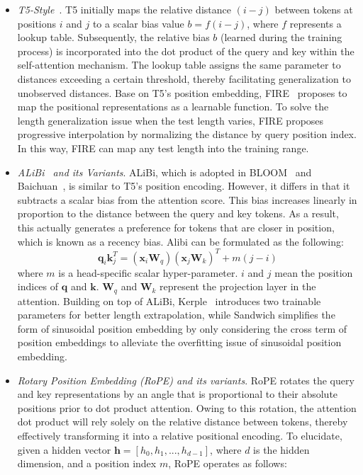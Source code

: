 \documentclass[11pt, a4paper, logo, copyright, nonumbering]{map}
\begin{document}
\begin{itemize}
\item \textit{T5-Style~\cite{raffel2020exploring}}. T5 initially maps the relative distance $(i - j)$ between tokens at positions $i$ and $j$ to a scalar bias value $b = f(i - j)$, where $f$ represents a lookup table. Subsequently, the relative bias $b$ (learned during the training process) is incorporated into the dot product of the query and key within the self-attention mechanism. The lookup table assigns the same parameter to distances exceeding a certain threshold, thereby facilitating generalization to unobserved distances. Base on T5's position embedding, FIRE~\cite{li2023functional} proposes to map the positional representations as a learnable function. To solve the length generalization issue when the test length varies, FIRE proposes progressive interpolation by normalizing the distance by query position index. In this way, FIRE can map any test length into the training range.
\item \textit{ALiBi~\cite{press2021train} and its Variants}. ALiBi, which is adopted in BLOOM~\citep{Scao2022BLOOMA1} and Baichuan~\citep{Yang2023Baichuan2O}, is similar to T5's position encoding. However, it differs in that it subtracts a scalar bias from the attention score. This bias increases linearly in proportion to the distance between the query and key tokens. As a result, this actually generates a preference for tokens that are closer in position, which is known as a recency bias. Alibi can be formulated as the following:
\begin{equation}
    \mathbf{q}_i \mathbf{k}_j^T = (\mathbf{x}_i \mathbf{W}_q)(\mathbf{x}_j \mathbf{W}_k)^T + m(j-i)
\end{equation}
where $m$ is a head-specific scalar hyper-parameter. $i$ and $j$ mean the position indices of $\mathbf{q}$ and $\mathbf{k}$. $\mathbf{W}_q$ and $\mathbf{W}_k$ represent the projection layer in the attention. Building on top of ALiBi, Kerple~\cite{chi2022kerple} introduces two trainable parameters for better length extrapolation, while Sandwich \cite{chi2022dissecting} simplifies the form of sinusoidal position embedding by only considering the cross term of position embeddings to alleviate the overfitting issue of sinusoidal position embedding.
\item \textit{Rotary Position Embedding (RoPE) \cite{su2024roformer} and its variants}. RoPE rotates the query and key representations by an angle that is proportional to their absolute positions prior to dot product attention. Owing to this rotation, the attention dot product will rely solely on the relative distance between tokens, thereby effectively transforming it into a relative positional encoding. To elucidate, given a hidden vector $\mathbf{h} =[h_0,h_1,...,h_{d-1}]$, where $d$ is the hidden dimension, and a position index $m$, RoPE operates as follows:

\end{itemize}
\end{document}
